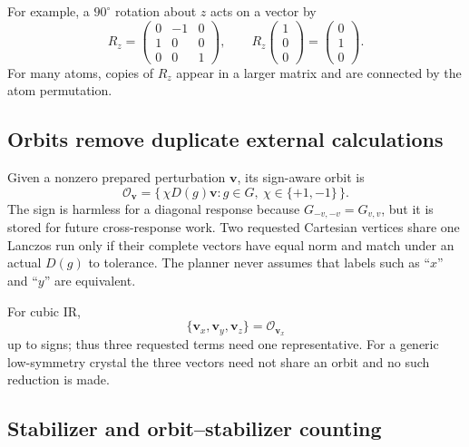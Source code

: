 \documentclass[11pt,a4paper]{article}
\begin{document}
For example, a $90^\circ$ rotation about $z$ acts on a vector by
\begin{equation}
  R_z=\begin{pmatrix}0&-1&0\\1&0&0\\0&0&1\end{pmatrix},\qquad
  R_z\begin{pmatrix}1\\0\\0\end{pmatrix}=
  \begin{pmatrix}0\\1\\0\end{pmatrix}.
\end{equation}
For many atoms, copies of $R_z$ appear in a larger matrix and are connected by
the atom permutation.

\subsection{Orbits remove duplicate external calculations}

Given a nonzero prepared perturbation $\bm v$, its sign-aware orbit is
\begin{equation}
  \mathcal O_{\bm v}=
  \{\,\chi D(g)\bm v:g\in G,\ \chi\in\{+1,-1\}\,\}.
  \label{eq:orbit}
\end{equation}
The sign is harmless for a diagonal response because
$G_{-v,-v}=G_{v,v}$, but it is stored for future cross-response work.  Two
requested Cartesian vertices share one Lanczos run only if their complete
vectors have equal norm and match under an actual $D(g)$ to tolerance.  The
planner never assumes that labels such as ``$x$'' and ``$y$'' are equivalent.

For cubic IR,
\begin{equation}
  \{\bm v_x,\bm v_y,\bm v_z\}=\mathcal O_{\bm v_x}
\end{equation}
up to signs; thus three requested terms need one representative.  For a
generic low-symmetry crystal the three vectors need not share an orbit and no
such reduction is made.

\subsection{Stabilizer and orbit--stabilizer counting}
\end{document}
